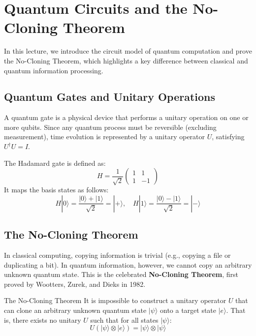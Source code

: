 \chapter{Quantum Circuits and the No-Cloning Theorem}

In this lecture, we introduce the circuit model of quantum computation and prove the No-Cloning Theorem, which highlights a key difference between classical and quantum information processing.

\section{Quantum Gates and Unitary Operations}

A quantum gate is a physical device that performs a unitary operation on one or more qubits. Since any quantum process must be reversible (excluding measurement), time evolution is represented by a unitary operator \(U\), satisfying \(U^\dagger U = I\).

The Hadamard gate is defined as:
\[
H = \frac{1}{\sqrt{2}} \begin{pmatrix} 1 & 1 \\ 1 & -1 \end{pmatrix}
\]
It maps the basis states as follows:
\[
H|0\rangle = \frac{|0\rangle + |1\rangle}{\sqrt{2}} = |+\rangle, \quad H|1\rangle = \frac{|0\rangle - |1\rangle}{\sqrt{2}} = |-\rangle
\]

\section{The No-Cloning Theorem}

In classical computing, copying information is trivial (e.g., copying a file or duplicating a bit). In quantum information, however, we cannot copy an arbitrary unknown quantum state. This is the celebrated \textbf{No-Cloning Theorem}, first proved by Wootters, Zurek, and Dieks in 1982.

\begin{theorembox}{The No-Cloning Theorem}
It is impossible to construct a unitary operator \(U\) that can clone an arbitrary unknown quantum state \(|\psi\rangle\) onto a target state \(|e\rangle\). That is, there exists no unitary \(U\) such that for all states \(|\psi\rangle\):
\[
U \left( |\psi\rangle \otimes |e\rangle \right) = |\psi\rangle \otimes |\psi\rangle
\]
\end{theorembox}

